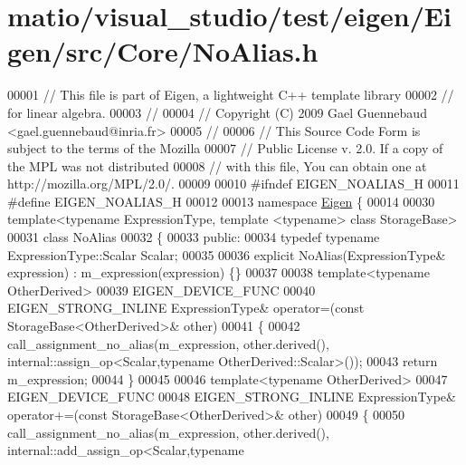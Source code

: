 \hypertarget{matio_2visual__studio_2test_2eigen_2_eigen_2src_2_core_2_no_alias_8h_source}{}\section{matio/visual\+\_\+studio/test/eigen/\+Eigen/src/\+Core/\+No\+Alias.h}
\label{matio_2visual__studio_2test_2eigen_2_eigen_2src_2_core_2_no_alias_8h_source}

\begin{DoxyCode}
00001 \textcolor{comment}{// This file is part of Eigen, a lightweight C++ template library}
00002 \textcolor{comment}{// for linear algebra.}
00003 \textcolor{comment}{//}
00004 \textcolor{comment}{// Copyright (C) 2009 Gael Guennebaud <gael.guennebaud@inria.fr>}
00005 \textcolor{comment}{//}
00006 \textcolor{comment}{// This Source Code Form is subject to the terms of the Mozilla}
00007 \textcolor{comment}{// Public License v. 2.0. If a copy of the MPL was not distributed}
00008 \textcolor{comment}{// with this file, You can obtain one at http://mozilla.org/MPL/2.0/.}
00009 
00010 \textcolor{preprocessor}{#ifndef EIGEN\_NOALIAS\_H}
00011 \textcolor{preprocessor}{#define EIGEN\_NOALIAS\_H}
00012 
00013 \textcolor{keyword}{namespace }\hyperlink{namespace_eigen}{Eigen} \{
00014 
00030 \textcolor{keyword}{template}<\textcolor{keyword}{typename} ExpressionType, \textcolor{keyword}{template} <\textcolor{keyword}{typename}> \textcolor{keyword}{class }StorageBase>
00031 \textcolor{keyword}{class }NoAlias
00032 \{
00033   \textcolor{keyword}{public}:
00034     \textcolor{keyword}{typedef} \textcolor{keyword}{typename} ExpressionType::Scalar Scalar;
00035     
00036     \textcolor{keyword}{explicit} NoAlias(ExpressionType& expression) : m\_expression(expression) \{\}
00037     
00038     \textcolor{keyword}{template}<\textcolor{keyword}{typename} OtherDerived>
00039     EIGEN\_DEVICE\_FUNC
00040     EIGEN\_STRONG\_INLINE ExpressionType& operator=(\textcolor{keyword}{const} StorageBase<OtherDerived>& other)
00041     \{
00042       call\_assignment\_no\_alias(m\_expression, other.derived(), internal::assign\_op<Scalar,typename
       OtherDerived::Scalar>());
00043       \textcolor{keywordflow}{return} m\_expression;
00044     \}
00045     
00046     \textcolor{keyword}{template}<\textcolor{keyword}{typename} OtherDerived>
00047     EIGEN\_DEVICE\_FUNC
00048     EIGEN\_STRONG\_INLINE ExpressionType& operator+=(\textcolor{keyword}{const} StorageBase<OtherDerived>& other)
00049     \{
00050       call\_assignment\_no\_alias(m\_expression, other.derived(), internal::add\_assign\_op<Scalar,typename

\end{DoxyCode}

